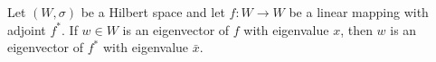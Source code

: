 Let $(W, \sigma)$ be a Hilbert space and let $f \colon W \to W$ be a linear mapping with adjoint $f^*$. If $w \in W$ is an eigenvector of $f$ with eigenvalue $x$, then $w$ is an eigenvector of $f^*$ with eigenvalue $\bar{x}$.
